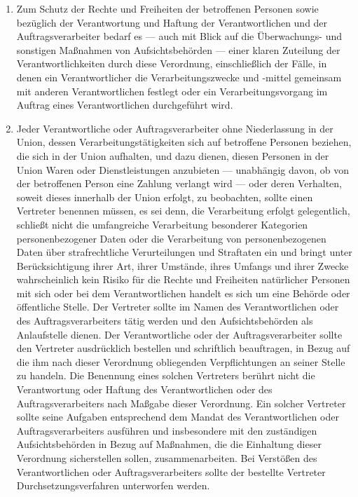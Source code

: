 \begin{enumerate}

   \item Zum Schutz der Rechte und Freiheiten der betroffenen Personen sowie bezüglich der Verantwortung und Haftung der
    Verantwortlichen und der Auftragsverarbeiter bedarf es — auch mit Blick auf die Überwachungs- und sonstigen
    Maßnahmen von Aufsichtsbehörden — einer klaren Zuteilung der Verantwortlichkeiten durch diese Verordnung,
    einschließlich der Fälle, in denen ein Verantwortlicher die Verarbeitungszwecke und -mittel gemeinsam mit anderen
    Verantwortlichen festlegt oder ein Verarbeitungsvorgang im Auftrag eines Verantwortlichen durchgeführt wird.%
   \label{eg:79}
   

   \item Jeder Verantwortliche oder Auftragsverarbeiter ohne Niederlassung in der Union, dessen Verarbeitungstätigkeiten
    sich auf betroffene Personen beziehen, die sich in der Union aufhalten, und dazu dienen, diesen Personen in der
    Union Waren oder Dienstleistungen anzubieten — unabhängig davon, ob von der betroffenen Person eine Zahlung
    verlangt wird — oder deren Verhalten, soweit dieses innerhalb der Union erfolgt, zu beobachten, sollte einen
    Vertreter benennen müssen, es sei denn, die Verarbeitung erfolgt gelegentlich, schließt nicht die umfangreiche
    Verarbeitung besonderer Kategorien personenbezogener Daten oder die Verarbeitung von personenbezogenen Daten über
    strafrechtliche Verurteilungen und Straftaten ein und bringt unter Berücksichtigung ihrer Art, ihrer Umstände,
    ihres Umfangs und ihrer Zwecke wahrscheinlich kein Risiko für die Rechte und Freiheiten natürlicher Personen mit
    sich oder bei dem Verantwortlichen handelt es sich um eine Behörde oder öffentliche Stelle. Der Vertreter sollte im
    Namen des Verantwortlichen oder des Auftragsverarbeiters tätig werden und den Aufsichtsbehörden als Anlaufstelle
    dienen. Der Verantwortliche oder der Auftragsverarbeiter sollte den Vertreter ausdrücklich bestellen und
    schriftlich beauftragen, in Bezug auf die ihm nach dieser Verordnung obliegenden Verpflichtungen an seiner Stelle
    zu handeln. Die Benennung eines solchen Vertreters berührt nicht die Verantwortung oder Haftung des
    Verantwortlichen oder des Auftragsverarbeiters nach Maßgabe dieser Verordnung. Ein solcher Vertreter sollte seine
    Aufgaben entsprechend dem Mandat des Verantwortlichen oder Auftragsverarbeiters ausführen und insbesondere mit den
    zuständigen Aufsichtsbehörden in Bezug auf Maßnahmen, die die Einhaltung dieser Verordnung sicherstellen sollen,
    zusammenarbeiten. Bei Verstößen des Verantwortlichen oder Auftragsverarbeiters sollte der bestellte Vertreter
    Durchsetzungsverfahren unterworfen werden.%
   \label{eg:80}
   

\end{enumerate}
